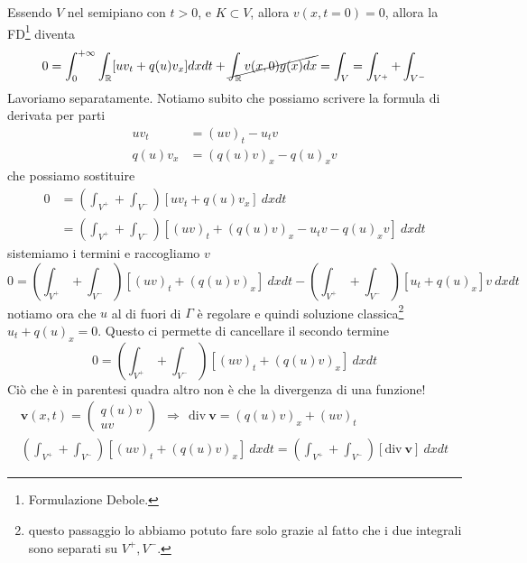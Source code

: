 \documentclass[10pt,a4paper,twoside,openright]{book}
\begin{document}
\begin{dimostrazione}
\begin{figure}[H]
\begin{tikzpicture}[x=0.75pt,y=0.75pt,yscale=-1,xscale=1]
		\end{tikzpicture}
	\end{figure}
	\FloatBarrier

	Essendo $V$ nel semipiano con $t >0$, e $K\subset V$, allora $v( x,t=0) =0$, allora la FD\footnote{Formulazione Debole.} diventa
	\begin{equation*}
		0=\int ^{+\infty }_{0}\int _{\mathbb{R}}[ uv_{t} +q( u) v_{x}] dxdt+\cancel{\int _{\mathbb{R}} v( x,0) g( x) dx} =\int _{V} =\int _{V^{+}} +\int _{V^{-}}
	\end{equation*}
	Lavoriamo separatamente. Notiamo subito che possiamo scrivere la formula di derivata per parti
	\begin{align*}
		uv_{t}      & =( uv)_{t} -u_{t} v          \\
		q( u) v_{x} & =( q( u) v)_{x} -q( u)_{x} v 
	\end{align*}
	che possiamo sostituire
	\begin{align*}
		0 & =\left(\int _{V^{+}} +\int _{V^{-}}\right)[ uv_{t} +q( u) v_{x}] \ dxdt                           \\
		  & =\left(\int _{V^{+}} +\int _{V^{-}}\right)[( uv)_{t} +( q( u) v)_{x} -u_{t} v-q( u)_{x} v] \ dxdt 
	\end{align*}
	sistemiamo i termini e raccogliamo $v$
	\begin{equation*}
		0=\left(\int _{V^{+}} +\int _{V^{-}}\right)[( uv)_{t} +( q( u) v)_{x}] \ dxdt-\left(\int _{V^{+}} +\int _{V^{-}}\right)[ u_{t} +q( u)_{x}] v\ dxdt
	\end{equation*}
	notiamo ora che $u$ al di fuori di $\Gamma $ è regolare e quindi soluzione classica\footnote{questo passaggio lo abbiamo potuto fare solo grazie al fatto che i due integrali sono separati su $V^{+} ,V^{-}$.} $u_{t} +q( u)_{x} =0$. Questo ci permette di cancellare il secondo termine
	\begin{equation*}
		0=\left(\int _{V^{+}} +\int _{V^{-}}\right)[( uv)_{t} +( q( u) v)_{x}] \ dxdt
	\end{equation*}
	Ciò che è in parentesi quadra altro non è che la divergenza di una funzione!
	\begin{gather*}
		\mathbf{v}( x,t) =
		\begin{pmatrix}
			q( u) v \\
			uv      
		\end{pmatrix} \ \ \Rightarrow \ \ \mathrm{div} \ \mathbf{v} =( q( u) v)_{x} +( uv)_{t}\\
		\left(\int _{V^{+}} +\int _{V^{-}}\right)[( uv)_{t} +( q( u) v)_{x}] \ dxdt=\left(\int _{V^{+}} +\int _{V^{-}}\right)[\mathrm{div} \ \mathbf{v}] \ dxdt

\end{gather*}
\end{dimostrazione}
\end{document}
